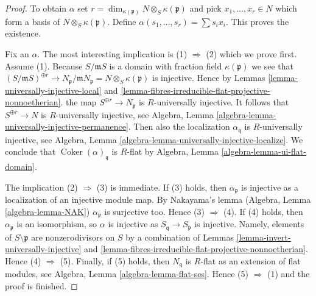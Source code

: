 \documentclass[10pt,a4paper]{amsart}
\theoremstyle{plain}
\theoremstyle{definition}
\theoremstyle{remark}
\numberwithin{equation}{subsection}
\def\Coker{\mathop{\mathrm{Coker}}}
\begin{document}
\begin{proof}
To obtain $\alpha$ set
$r = \dim_{\kappa(\mathfrak p)} N \otimes_S \kappa(\mathfrak p)$ and pick
$x_1, \ldots, x_r \in N$ which form a basis of
$N \otimes_S \kappa(\mathfrak p)$. Define
$\alpha(s_1, \ldots, s_r) = \sum s_i x_i$. This proves the existence.

\medskip\noindent
Fix an $\alpha$. The most interesting implication is
(1) $\Rightarrow$ (2) which we prove first. Assume (1).
Because $S/\mathfrak mS$ is a domain with fraction field $\kappa(\mathfrak p)$
we see that
$(S/\mathfrak mS)^{\oplus r} \to
N_{\mathfrak p}/\mathfrak mN_{\mathfrak p} = N \otimes_S \kappa(\mathfrak p)$
is injective. Hence by
Lemmas \ref{lemma-universally-injective-local} and
\ref{lemma-fibres-irreducible-flat-projective-nonnoetherian}.
the map $S^{\oplus r} \to N_{\mathfrak p}$ is $R$-universally injective.
It follows that $S^{\oplus r} \to N$ is $R$-universally injective, see
Algebra, Lemma \ref{algebra-lemma-universally-injective-permanence}.
Then also the localization $\alpha_{\mathfrak q}$ is $R$-universally
injective, see
Algebra, Lemma \ref{algebra-lemma-universally-injective-localize}.
We conclude that $\Coker(\alpha)_{\mathfrak q}$ is $R$-flat by
Algebra, Lemma \ref{algebra-lemma-ui-flat-domain}.

\medskip\noindent
The implication (2) $\Rightarrow$ (3) is immediate. If (3) holds, then
$\alpha_{\mathfrak p}$ is injective as a localization of an injective
module map. By Nakayama's lemma
(Algebra, Lemma \ref{algebra-lemma-NAK})
$\alpha_{\mathfrak p}$ is surjective too. Hence (3) $\Rightarrow$ (4).
If (4) holds, then $\alpha_{\mathfrak p}$ is an isomorphism, so
$\alpha$ is injective as $S_{\mathfrak q} \to S_{\mathfrak p}$ is injective.
Namely, elements of $S \setminus \mathfrak p$ are nonzerodivisors on $S$
by a combination of
Lemmas \ref{lemma-invert-universally-injective} and
\ref{lemma-fibres-irreducible-flat-projective-nonnoetherian}.
Hence (4) $\Rightarrow$ (5). Finally, if (5) holds, then
$N_{\mathfrak q}$ is $R$-flat as an extension of flat modules, see
Algebra, Lemma \ref{algebra-lemma-flat-ses}.
Hence (5) $\Rightarrow$ (1) and the proof is finished.
\end{proof}
\end{document}
